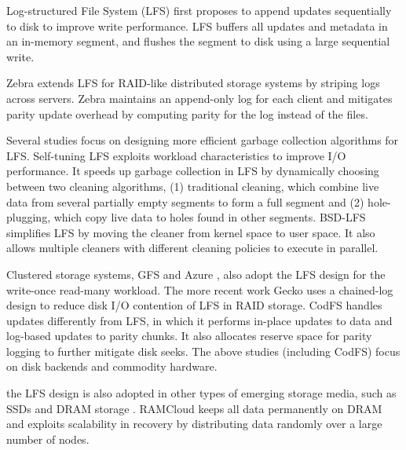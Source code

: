 
Log-structured File System (LFS) \cite{rosenblum92} first proposes to append
updates sequentially to disk to improve write performance. LFS buffers all 
updates and metadata in an in-memory segment, and flushes the segment to disk
using a large sequential write.

Zebra \cite{hartman95} extends LFS for RAID-like distributed storage systems by
striping logs across servers. Zebra maintains an append-only log for each client
and mitigates parity update overhead by computing parity for the log instead of
the files. 

Several studies focus on designing more efficient garbage collection algorithms
for LFS. Self-tuning LFS \cite{matthews97} exploits workload characteristics to
improve I/O performance. It speeds up garbage collection in LFS by dynamically
choosing between two cleaning algorithms, (1) traditional cleaning, which
combine live data from several partially empty segments to form a full segment
and (2) hole-plugging, which copy live data to holes found in other segments.
BSD-LFS \cite{seltzer93,seltzer95} simplifies LFS by moving the cleaner from
kernel space to user space. It also allows multiple cleaners with different
cleaning policies to execute in parallel.

Clustered storage systems, GFS \cite{ghemawat03} and Azure \cite{calder11}, also
adopt the LFS design for the write-once read-many workload.  The more recent
work Gecko \cite{shin13} uses a chained-log design to reduce disk I/O contention
of LFS in RAID storage.  CodFS handles updates differently from LFS, in which it
performs in-place updates to data and log-based updates to parity chunks.  It
also allocates reserve space for parity logging to further mitigate disk seeks.
The above studies (including CodFS) focus on disk backends and commodity
hardware. 

the LFS design is also adopted in other types of emerging storage media, such as
SSDs \cite{agrawal08} and DRAM storage \cite{ongaro11}.  RAMCloud keeps all data
permanently on DRAM and exploits scalability in recovery by distributing data
randomly over a large number of nodes.



